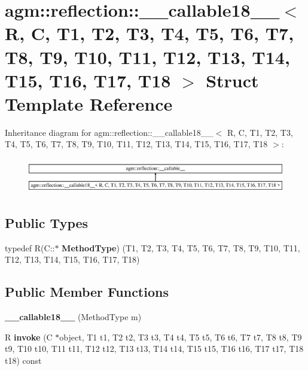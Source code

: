 \hypertarget{structagm_1_1reflection_1_1____callable18____}{}\section{agm\+:\+:reflection\+:\+:\+\_\+\+\_\+callable18\+\_\+\+\_\+$<$ R, C, T1, T2, T3, T4, T5, T6, T7, T8, T9, T10, T11, T12, T13, T14, T15, T16, T17, T18 $>$ Struct Template Reference}
\label{structagm_1_1reflection_1_1____callable18____}
Inheritance diagram for agm\+:\+:reflection\+:\+:\+\_\+\+\_\+callable18\+\_\+\+\_\+$<$ R, C, T1, T2, T3, T4, T5, T6, T7, T8, T9, T10, T11, T12, T13, T14, T15, T16, T17, T18 $>$\+:\begin{figure}[H]
\begin{center}
\leavevmode
\includegraphics[height=1.553398cm]{structagm_1_1reflection_1_1____callable18____}
\end{center}
\end{figure}
\subsection*{Public Types}
\begin{DoxyCompactItemize}
\item 
typedef R(C\+::$\ast$ {\bfseries Method\+Type}) (T1, T2, T3, T4, T5, T6, T7, T8, T9, T10, T11, T12, T13, T14, T15, T16, T17, T18)\hypertarget{structagm_1_1reflection_1_1____callable18_____ae736b45ba1fbde073fef60297d2a26bf}{}\label{structagm_1_1reflection_1_1____callable18_____ae736b45ba1fbde073fef60297d2a26bf}

\end{DoxyCompactItemize}
\subsection*{Public Member Functions}
\begin{DoxyCompactItemize}
\item 
{\bfseries \+\_\+\+\_\+callable18\+\_\+\+\_\+} (Method\+Type m)\hypertarget{structagm_1_1reflection_1_1____callable18_____a263d7aeb7fe75bd4f8137c8ab0b43255}{}\label{structagm_1_1reflection_1_1____callable18_____a263d7aeb7fe75bd4f8137c8ab0b43255}

\item 
R {\bfseries invoke} (C $\ast$object, T1 t1, T2 t2, T3 t3, T4 t4, T5 t5, T6 t6, T7 t7, T8 t8, T9 t9, T10 t10, T11 t11, T12 t12, T13 t13, T14 t14, T15 t15, T16 t16, T17 t17, T18 t18) const \hypertarget{structagm_1_1reflection_1_1____callable18_____a5f2f91279acfbce6a1945abf4f07b447}{}\label{structagm_1_1reflection_1_1____callable18_____a5f2f91279acfbce6a1945abf4f07b447}

\end{DoxyCompactItemize}
